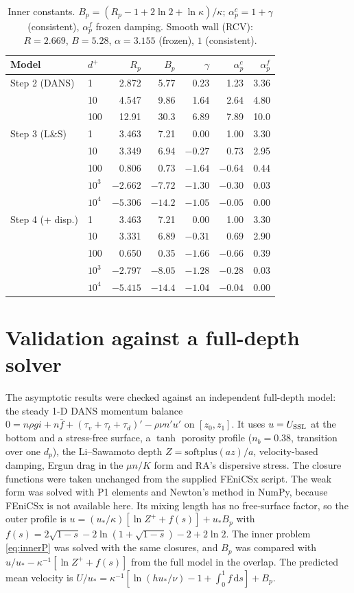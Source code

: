 \documentclass[10pt,a4paper]{article}
\newcommand{\dd}{\mathrm{d}}
\newcommand{\Rp}{R_p}
\begin{document}
\begin{table}[t]\centering\small
\caption{Inner constants. $B_p=(\Rp-1+2\ln2+\ln\kappa)/\kappa$; $\alpha_p^{c}=1+\gamma$ (consistent), $\alpha_p^{f}$ frozen damping. Smooth wall (RCV): $R=2.669$, $B=5.28$, $\alpha=3.155$ (frozen), $1$ (consistent).}
\label{tab:Rp}
\begin{tabular}{llrrrrr}
\toprule
Model & $d^+$ & $\Rp$ & $B_p$ & $\gamma$ & $\alpha_p^{c}$ & $\alpha_p^{f}$\\
\midrule
Step 2 (DANS) & 1 & 2.872 & 5.77 & 0.23 & 1.23 & 3.36\\
 & 10 & 4.547 & 9.86 & 1.64 & 2.64 & 4.80\\
 & 100 & 12.91 & 30.3 & 6.89 & 7.89 & 10.0\\
\midrule
Step 3 (L\&S) & 1 & 3.463 & 7.21 & 0.00 & 1.00 & 3.30\\
 & 10 & 3.349 & 6.94 & $-0.27$ & 0.73 & 2.95\\
 & 100 & 0.806 & 0.73 & $-1.64$ & $-0.64$ & 0.44\\
 & $10^3$ & $-2.662$ & $-7.72$ & $-1.30$ & $-0.30$ & 0.03\\
 & $10^4$ & $-5.306$ & $-14.2$ & $-1.05$ & $-0.05$ & 0.00\\
\midrule
Step 4 (+ disp.) & 1 & 3.463 & 7.21 & 0.00 & 1.00 & 3.30\\
 & 10 & 3.331 & 6.89 & $-0.31$ & 0.69 & 2.90\\
 & 100 & 0.650 & 0.35 & $-1.66$ & $-0.66$ & 0.39\\
 & $10^3$ & $-2.797$ & $-8.05$ & $-1.28$ & $-0.28$ & 0.03\\
 & $10^4$ & $-5.415$ & $-14.4$ & $-1.04$ & $-0.04$ & 0.00\\
\bottomrule
\end{tabular}
\end{table}

\section{Validation against a full-depth solver}\label{sec:valid}
The asymptotic results were checked against an independent full-depth model: the steady 1-D DANS momentum balance $0=n\rho gi+n\bar f+(\tau_v+\tau_t+\tau_d)'-\rho\nu n'u'$ on $[z_0,z_1]$. It uses $u=U_{\rm SSL}$ at the bottom and a stress-free surface, a $\tanh$ porosity profile ($n_b=0.38$, transition over one $d_p$), the Li--Sawamoto depth $Z=\mathrm{softplus}(az)/a$, velocity-based damping, Ergun drag in the $\mu n/K$ form and RA's dispersive stress. The closure functions were taken unchanged from the supplied FEniCSx script. The weak form was solved with P1 elements and Newton's method in NumPy, because FEniCSx is not available here. Its mixing length has no free-surface factor, so the outer profile is $u=(u_*/\kappa)[\ln Z^++f(s)]+u_*B_p$ with $f(s)=2\sqrt{1-s}-2\ln(1+\sqrt{1-s})-2+2\ln2$. The inner problem \eqref{eq:innerP} was solved with the same closures, and $B_p$ was compared with $u/u_*-\kappa^{-1}[\ln Z^++f(s)]$ from the full model in the overlap. The predicted mean velocity is $U/u_*=\kappa^{-1}[\ln(hu_*/\nu)-1+\int_0^1f\,\dd s]+B_p$.
\end{document}
